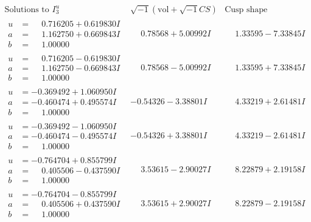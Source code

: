 \documentclass[1p]{elsarticle_modified}
\theoremstyle{definition}
\newcommand{\I}{\sqrt{-1}}
\begin{document}
$$\begin{array}{c|c|c}  
\text{Solutions to }I^u_{3}& \I (\text{vol} + \sqrt{-1}CS) & \text{Cusp shape}\\
 \hline 
\begin{aligned}
u &= \phantom{-}0.716205 + 0.619830 I \\
a &= \phantom{-}1.162750 + 0.669843 I \\
b &= \phantom{-}1.00000\phantom{ +0.000000I}\end{aligned}
 & \phantom{-}0.78568 + 5.00992 I & \phantom{-}1.33595 - 7.33845 I \\ \hline\begin{aligned}
u &= \phantom{-}0.716205 - 0.619830 I \\
a &= \phantom{-}1.162750 - 0.669843 I \\
b &= \phantom{-}1.00000\phantom{ +0.000000I}\end{aligned}
 & \phantom{-}0.78568 - 5.00992 I & \phantom{-}1.33595 + 7.33845 I \\ \hline\begin{aligned}
u &= -0.369492 + 1.060950 I \\
a &= -0.460474 + 0.495574 I \\
b &= \phantom{-}1.00000\phantom{ +0.000000I}\end{aligned}
 & -0.54326 - 3.38801 I & \phantom{-}4.33219 + 2.61481 I \\ \hline\begin{aligned}
u &= -0.369492 - 1.060950 I \\
a &= -0.460474 - 0.495574 I \\
b &= \phantom{-}1.00000\phantom{ +0.000000I}\end{aligned}
 & -0.54326 + 3.38801 I & \phantom{-}4.33219 - 2.61481 I \\ \hline\begin{aligned}
u &= -0.764704 + 0.855799 I \\
a &= \phantom{-}0.405506 - 0.437590 I \\
b &= \phantom{-}1.00000\phantom{ +0.000000I}\end{aligned}
 & \phantom{-}3.53615 - 2.90027 I & \phantom{-}8.22879 + 2.19158 I \\ \hline\begin{aligned}
u &= -0.764704 - 0.855799 I \\
a &= \phantom{-}0.405506 + 0.437590 I \\
b &= \phantom{-}1.00000\phantom{ +0.000000I}\end{aligned}
 & \phantom{-}3.53615 + 2.90027 I & \phantom{-}8.22879 - 2.19158 I \\ \hline\begin{aligned}

\end{aligned}
\end{array}$$
\end{document}
